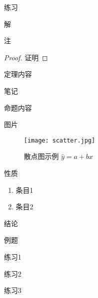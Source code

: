 \documentclass[lang=cn,newtx,10pt,scheme=chinese]{elegantbook}
\begin{document}
\begin{exercise}\label{exer:43}
	练习
\end{exercise}

\begin{solution}
	解
\end{solution}

\begin{remark}
	注
\end{remark}

\begin{proof}
	证明
\end{proof}

\begin{theorem}[定理名称] \label{thm:fubi} 
	定理内容
\end{theorem}

\begin{note}
	笔记
\end{note}

\begin{proposition}[命题名称] \label{pro:max}
	命题内容
\end{proposition}

图片
\begin{figure}[htbp]
	\centering
	\texttt{[image: scatter.jpg]}
	\caption{散点图示例 $\hat{y}=a+bx$ \label{fig:scatter}}
\end{figure}

\begin{property}\label{property:cauchy}
	性质
	\begin{enumerate}
		\item 条目1
		\item 条目2
	\end{enumerate}
\end{property}

\begin{conclusion}
	结论
\end{conclusion}

\begin{example}
	例题
\end{example}

\begin{problemset}
	\item 练习1
	\item 练习2
	\item 练习3
\end{problemset}
	
\end{document}
